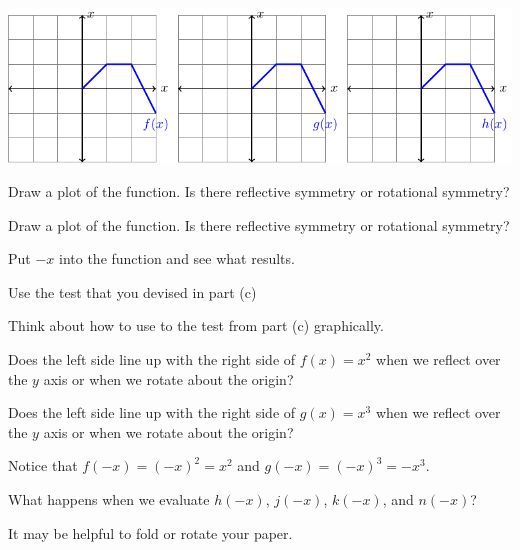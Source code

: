 \begin{activity}
\begin{center}
                \includegraphics[width=0.9\columnwidth]{figures/0-3-fig4.pdf}
            \end{center}
    \ea
\end{activity}
\begin{smallhint}
   \ba
        \item Draw a plot of the function.  Is there reflective symmetry or rotational
            symmetry?
        \item Draw a plot of the function.  Is there reflective symmetry or rotational
            symmetry?
        \item Put $-x$ into the function and see what results.
        \item Use the test that you devised in part (c)
        \item Think about how to use to the test from part (c) graphically.
   \ea
\end{smallhint}
\begin{bighint}
   \ba
        \item Does the left side line up with the right side of $f(x) = x^2$ when we
            reflect over the $y$ axis or when we rotate about the origin?
        \item Does the left side line up with the right side of $g(x) = x^3$ when we
            reflect over the $y$ axis or when we rotate about the origin?
        \item Notice that $f(-x) = (-x)^2 = x^2$ and $g(-x) = (-x)^3 = -x^3$.
        \item What happens when we evaluate $h(-x)$, $j(-x)$, $k(-x)$, and $n(-x)$?
        \item It may be helpful to fold or rotate your paper.
   \ea
\end{bighint}
